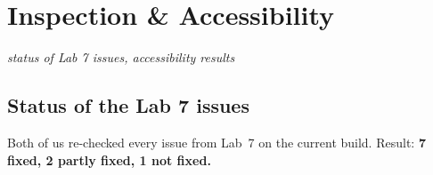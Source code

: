 \documentclass[10pt,a4paper]{article}
\begin{document}
\section{Inspection \& Accessibility}
\hfill\emph{status of Lab 7 issues, accessibility results}

\subsection{Status of the Lab 7 issues}

Both of us re-checked every issue from Lab~7 on the current build.
Result: \textbf{7 fixed, 2 partly fixed, 1 not fixed.}
\end{document}
